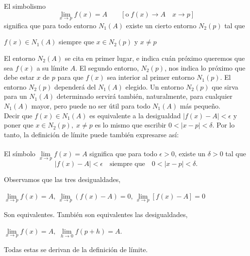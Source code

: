 \begin{tcolorbox}[colback=white]
    \begin{def.}
	El simbolismo $$\lim_{x\to p}f(x)=A\qquad [\mbox{o}\; {f(x)\to A}\quad {x\to p}]$$
	significa que para todo entorno $N_1(A)$ existe un cierto entorno $N_2(p)$ tal que 
	\begin{center}
	    $f(x)\in N_1(A)$ siempre que $x\in N_2(p)$ y $x\neq p$
	\end{center}
	\vspace{0.3cm}
	El entorno $N_2(A)$ se cita en primer lugar, e indica cuán próximo queremos que sea $f(x)$ a su límite $A$. El segundo entorno, $N_2(p)$, nos indica lo próximo que debe estar $x$ de $p$ para que $f(x)$ sea interior al primer entorno $N_1(p)$. El entorno $N_2(p)$ dependerá del $N_1(A)$ elegido. Un entorno $N_2(p)$ que sirva para un $N_1(A)$ determinado servirá también, naturalmente, para cualquier $N_1(A)$ mayor, pero puede no ser útil para todo $N_1(A)$ más pequeño.\\
	Decir que $f(x)\in N_1(A)$ es equivalente a la desigualdad $|f(x)-A|<\epsilon$ y poner que $x\in N_2(p),\; x\neq p$ es lo mismo que escribir $0<|x-p|<\delta$. Por lo tanto, la definición de límite puede también expresarse así:\\\\
	El símbolo $\lim\limits_{x\to p}f(x)=A$ significa que para todo $\epsilon > 0$, existe un $\delta >0$ tal que $$|f(x)-A|<\epsilon \quad \mbox{siempre que}\quad 0<|x-p|<\delta.$$
    \end{def.}
\end{tcolorbox}

Observamos que las tres desigualdades,

\begin{center}
    $\lim\limits_{x\to p}f(x)=A$, $\lim\limits_{x\to p}(f(x)-A)=0$, $\lim\limits_{x\to p}[f(x)-A]=0$
\end{center}

Son equivalentes. También son equivalentes las desigualdades,

\begin{center}
    $\lim\limits_{x\to p} f(x)=A,$ $\lim\limits_{h\to 0}f(p+h)=A.$
\end{center}

Todas estas se derivan de la definición de límite.


